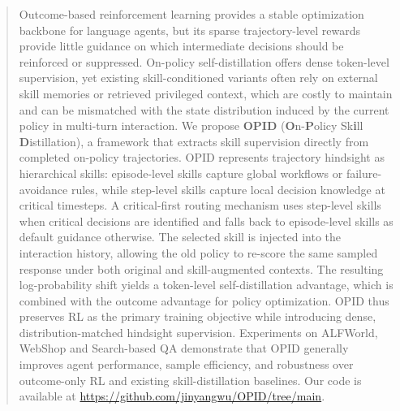 \begin{abstract}
Outcome-based reinforcement learning provides a stable optimization backbone for language agents, but its sparse trajectory-level rewards provide little guidance on which intermediate decisions should be reinforced or suppressed. On-policy self-distillation offers dense token-level supervision, yet existing skill-conditioned variants often rely on external skill memories or retrieved privileged context, which are costly to maintain and can be mismatched with the state distribution induced by the current policy in multi-turn interaction. We propose \textbf{OPID} (\textbf{O}n-\textbf{P}olicy Sk\textbf{i}ll \textbf{D}istillation), a framework that extracts skill supervision directly from completed on-policy trajectories. OPID represents trajectory hindsight as hierarchical skills: episode-level skills capture global workflows or failure-avoidance rules, while step-level skills capture local decision knowledge at critical timesteps. A critical-first routing mechanism uses step-level skills when critical decisions are identified and falls back to episode-level skills as default guidance otherwise. The selected skill is injected into the interaction history, allowing the old policy to re-score the same sampled response under both original and skill-augmented contexts. The resulting log-probability shift yields a token-level self-distillation advantage, which is combined with the outcome advantage for policy optimization. OPID thus preserves RL as the primary training objective while introducing dense, distribution-matched hindsight supervision. Experiments on ALFWorld, WebShop and Search-based QA demonstrate that OPID generally improves agent performance, sample efficiency, and robustness over outcome-only RL and existing skill-distillation baselines. Our code is available at \url{https://github.com/jinyangwu/OPID/tree/main}.
\end{abstract}
